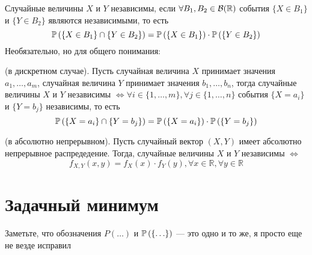 \documentclass{article}
\begin{document}
 Случайные величины $X$ и $Y$ независимы, если $\forall B_1,B_2\in\mathcal{B}(\mathbb{R})$ события $\{X\in B_1\}$ и $\{Y\in B_2\}$ являются независимыми, то есть
\begin{equation*}
    \mathbb{P}\left(\{X\in B_1\}\cap\{Y\in B_2\}\right)=\mathbb{P}\left(\{X\in B_1\}\right)\cdot\mathbb{P}\left(\{Y\in B_2\}\right)
\end{equation*}
Необязательно, но для общего понимания:

\theorem (в дискретном случае). Пусть случайная величина $X$ принимает значения $a_1,\ldots,a_m$, случайная величина $Y$ принимает значения $b_1,\ldots,b_n$, тогда случайные величины $X$ и $Y$ независимы $\Longleftrightarrow \forall i\in\{1,\ldots,m\},\forall j\in\{1,\ldots,n\}$ события $\{X=a_i\}$ и $\{Y=b_j\}$ независимы, то есть
\begin{equation*}
    \mathbb{P}\left(\{X=a_i\}\cap\{Y=b_j\}\right)=\mathbb{P}\left(\{X=a_i\}\right)\cdot\mathbb{P}\left(\{Y=b_j\}\right)
\end{equation*}

\theorem (в абсолютно непрерывном). Пусть случайный вектор $(X,Y)$ имеет абсолютно непрерывное распредедение. Тогда, случайные величины $X$ и $Y$ независимы $\Longleftrightarrow$
\begin{equation*}
    f_{X,Y}(x,y)=f_X(x)\cdot f_{Y}(y),\forall x\in\mathbb{R},\forall y\in\mathbb{R}
\end{equation*}

    



\newpage
\section{Задачный минимум}
Заметьте, что обозначения $P(\ldots)$ и $\mathbb{P}\left(\{\ldots\}\right)$ — это одно и то же, я просто еще не везде исправил
    
\end{document}
